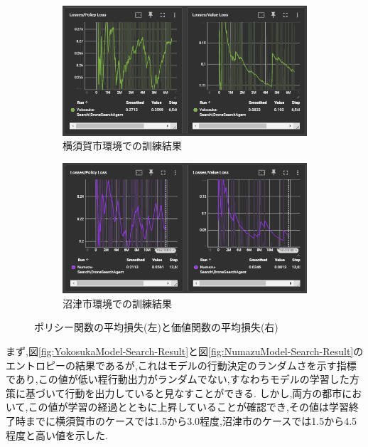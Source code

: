 \begin{figure}[H]
  \centering
  \begin{subfigure}{0.45\textwidth}
      \centering
      \includegraphics[width=\textwidth]{Figures/YokosukaSearch-ModelResult2.png}
      \caption{横須賀市環境での訓練結果}
      \label{fig:YokosukaModel-Search-Result2}
  \end{subfigure}
  \begin{subfigure}{0.45\textwidth}
      \centering
      \includegraphics[width=\textwidth]{Figures/NumazuSearch-ModlRsult2.png}
      \caption{沼津市環境での訓練結果}
      \label{fig:NumazuModel-Search-Result2}
  \end{subfigure}
  \caption{ポリシー関数の平均損失(左)と価値関数の平均損失(右)}
  \label{fig:SearchModel-Result-Errors}
\end{figure}
まず,図\ref{fig:YokosukaModel-Search-Result}と図\ref{fig:NumazuModel-Search-Result}のエントロピーの結果であるが,これはモデルの行動決定のランダムさを示す指標であり,この値が低い程行動出力がランダムでない,すなわちモデルの学習した方策に基づいて行動を出力していると見なすことができる.
しかし,両方の都市において,この値が学習の経過とともに上昇していることが確認でき,その値は学習終了時までに横須賀市のケースでは1.5から3.0程度,沼津市のケースでは1.5から4.5程度と高い値を示した.
